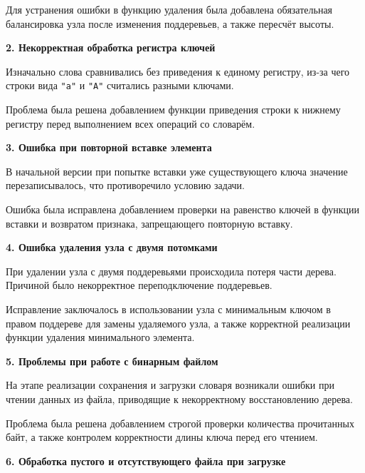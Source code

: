 \documentclass[12pt]{article}
\begin{document}
Для устранения ошибки в функцию удаления была добавлена обязательная балансировка узла после изменения поддеревьев, а также пересчёт высоты.

\vspace{1\baselineskip}
\textbf{2. Некорректная обработка регистра ключей}
\vspace{1\baselineskip}

Изначально слова сравнивались без приведения к единому регистру, из-за чего строки вида \texttt{"a"} и \texttt{"A"} считались разными ключами.

Проблема была решена добавлением функции приведения строки к нижнему регистру перед выполнением всех операций со словарём.

\vspace{1\baselineskip}
\textbf{3. Ошибка при повторной вставке элемента}
\vspace{1\baselineskip}

В начальной версии при попытке вставки уже существующего ключа значение перезаписывалось, что противоречило условию задачи.

Ошибка была исправлена добавлением проверки на равенство ключей в функции вставки и возвратом признака, запрещающего повторную вставку.

\vspace{1\baselineskip}
\textbf{4. Ошибка удаления узла с двумя потомками}
\vspace{1\baselineskip}

При удалении узла с двумя поддеревьями происходила потеря части дерева. Причиной было некорректное переподключение поддеревьев.

Исправление заключалось в использовании узла с минимальным ключом в правом поддереве для замены удаляемого узла, а также корректной реализации функции удаления минимального элемента.

\vspace{1\baselineskip}
\textbf{5. Проблемы при работе с бинарным файлом}
\vspace{1\baselineskip}

На этапе реализации сохранения и загрузки словаря возникали ошибки при чтении данных из файла, приводящие к некорректному восстановлению дерева.

Проблема была решена добавлением строгой проверки количества прочитанных байт, а также контролем корректности длины ключа перед его чтением.

\vspace{1\baselineskip}
\textbf{6. Обработка пустого и отсутствующего файла при загрузке}
\vspace{1\baselineskip}
\end{document}
